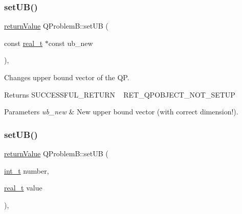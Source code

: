 \subsubsection{\texorpdfstring{set\+U\+B()}{setUB()}\hspace{0.1cm}{\footnotesize\ttfamily [1/2]}}
{\footnotesize\ttfamily \hyperlink{_message_handling_8hpp_a81d556f613bfbabd0b1f9488c0fa865e}{return\+Value} Q\+Problem\+B\+::set\+UB (\begin{DoxyParamCaption}\item[{const \hyperlink{qp_o_a_s_e_s__wrapper_8h_a0d00e2b3dfadee81331bbb39068570c4}{real\+\_\+t} $\ast$const}]{ub\+\_\+new }\end{DoxyParamCaption})\hspace{0.3cm}{\ttfamily [inline]}, {\ttfamily [protected]}}

Changes upper bound vector of the QP. \begin{DoxyReturn}{Returns}
S\+U\+C\+C\+E\+S\+S\+F\+U\+L\+\_\+\+R\+E\+T\+U\+RN ~\newline
 R\+E\+T\+\_\+\+Q\+P\+O\+B\+J\+E\+C\+T\+\_\+\+N\+O\+T\+\_\+\+S\+E\+T\+UP 
\end{DoxyReturn}

\begin{DoxyParams}{Parameters}
{\em ub\+\_\+new} & New upper bound vector (with correct dimension!). \\
\hline
\end{DoxyParams}
\mbox{\label{class_q_problem_b_ad60b2cfc86789f10e1d3cf70aae4977c}} 
\subsubsection{\texorpdfstring{set\+U\+B()}{setUB()}\hspace{0.1cm}{\footnotesize\ttfamily [2/2]}}
{\footnotesize\ttfamily \hyperlink{_message_handling_8hpp_a81d556f613bfbabd0b1f9488c0fa865e}{return\+Value} Q\+Problem\+B\+::set\+UB (\begin{DoxyParamCaption}\item[{\hyperlink{_types_8hpp_ab6fd6105e64ed14a0c9281326f05e623}{int\+\_\+t}}]{number,  }\item[{\hyperlink{qp_o_a_s_e_s__wrapper_8h_a0d00e2b3dfadee81331bbb39068570c4}{real\+\_\+t}}]{value }\end{DoxyParamCaption})\hspace{0.3cm}{\ttfamily [inline]}, {\ttfamily [protected]}}

